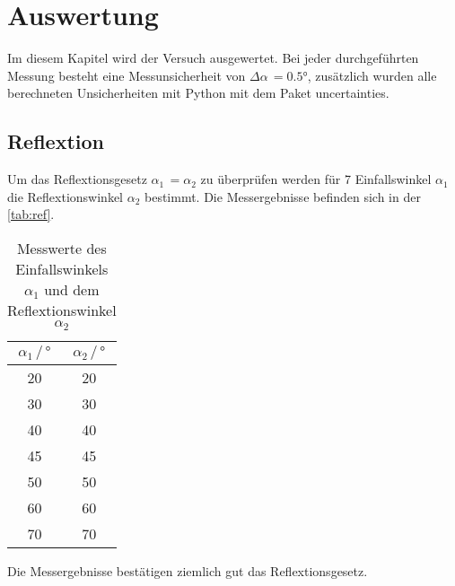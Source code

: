 \newpage
\section{Auswertung}
Im diesem Kapitel wird der Versuch ausgewertet. Bei jeder durchgeführten Messung besteht eine Messunsicherheit von $\Delta \alpha \, = 0.5 °$, zusätzlich wurden alle 
berechneten Unsicherheiten mit Python mit dem Paket uncertainties\cite{uncertainties}.

\subsection{Reflextion}
Um das Reflextionsgesetz $\alpha_1 \, = \alpha_2$ zu überprüfen werden für 7 Einfallswinkel $\alpha_1$ die Reflextionswinkel $\alpha_2$ bestimmt.
Die Messergebnisse befinden sich in der \autoref{tab:ref}. 

\begin{table}
    \centering
    \caption{Messwerte des Einfallswinkels $\alpha_1$ und dem Reflextionswinkel $\alpha_2$}
    \label{tab:ref}
    \begin{tabular}{c c}
    \toprule
         $\alpha_1 \, / \, ° $ & $\alpha_2 \, / \, ° $\\
    \midrule 
    20 & 20\\
    30 & 30\\
    40 & 40\\
    45 & 45\\
    50 & 50\\
    60 & 60\\
    70 & 70\\
    \bottomrule
    \end{tabular}
\end{table}

\noindent
Die Messergebnisse bestätigen ziemlich gut das Reflextionsgesetz.

